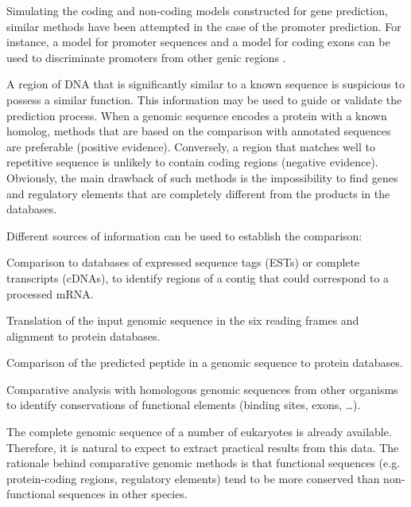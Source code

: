 Simulating the coding and non-coding models constructed for gene prediction, similar methods have
been attempted in the case of the promoter prediction. For instance, a model for 
promoter sequences and a model for coding exons can be used to discriminate promoters from other 
genic regions \citep{ohler:2000a}.



 
A region of DNA that is significantly similar to a known sequence is suspicious to possess a 
similar function. This information may be used to guide or validate the prediction process.
When a genomic sequence encodes a protein with a known homolog, methods that
are based on the comparison with annotated sequences are preferable 
(positive evidence). Conversely, a region that matches well to repetitive sequence is unlikely to 
contain coding regions (negative evidence). Obviously, the main drawback of such methods is the 
impossibility to find genes and regulatory elements that are completely different from the 
products in the databases.

Different sources of information can be used to establish the comparison:
\begin{mitemize}
\item
Comparison to databases of expressed sequence tags (ESTs) or complete transcripts (cDNAs),
to identify regions of a contig that could correspond to a processed mRNA.
\item
Translation of the input genomic sequence in the six reading frames and alignment to protein databases.
\item
Comparison of the predicted peptide in a genomic sequence to protein databases.
\item
Comparative analysis with homologous genomic sequences from other organisms to identify conservations
of functional elements (binding sites, exons, \ldots).
\end{mitemize}



The complete genomic sequence of a number of eukaryotes is already available. Therefore, it is natural
to expect to extract practical results from this data. The rationale behind comparative genomic
methods is that functional sequences (e.g. protein-coding regions, regulatory elements) tend to be
more conserved than non-functional sequences in other species. 

